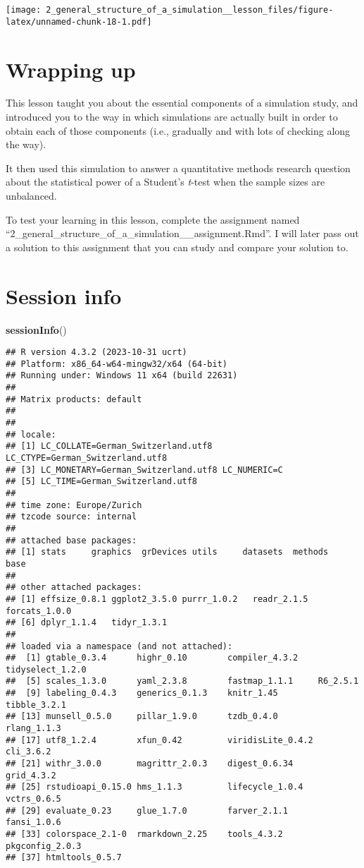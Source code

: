 \documentclass[
]{article}
\newenvironment{Shaded}{\begin{snugshade}}{\end{snugshade}}
\newcommand{\FunctionTok}[1]{\textcolor[rgb]{0.13,0.29,0.53}{\textbf{#1}}}
\newcommand{\NormalTok}[1]{#1}
\begin{document}
\texttt{[image: 2\_general\_structure\_of\_a\_simulation\_\_lesson\_files/figure-latex/unnamed-chunk-18-1.pdf]}

\hypertarget{wrapping-up}{%
\section{Wrapping up}\label{wrapping-up}}

This lesson taught you about the essential components of a simulation
study, and introduced you to the way in which simulations are actually
built in order to obtain each of those components (i.e., gradually and
with lots of checking along the way).

It then used this simulation to answer a quantitative methods research
question about the statistical power of a Student's \emph{t}-test when
the sample sizes are unbalanced.

To test your learning in this lesson, complete the assignment named
``2\_general\_structure\_of\_a\_simulation\_\_assignment.Rmd''. I will
later pass out a solution to this assignment that you can study and
compare your solution to.

\hypertarget{session-info}{%
\section{Session info}\label{session-info}}

\begin{Shaded}
\begin{Highlighting}[]
\FunctionTok{sessionInfo}\NormalTok{()}
\end{Highlighting}
\end{Shaded}

\begin{verbatim}
## R version 4.3.2 (2023-10-31 ucrt)
## Platform: x86_64-w64-mingw32/x64 (64-bit)
## Running under: Windows 11 x64 (build 22631)
## 
## Matrix products: default
## 
## 
## locale:
## [1] LC_COLLATE=German_Switzerland.utf8  LC_CTYPE=German_Switzerland.utf8   
## [3] LC_MONETARY=German_Switzerland.utf8 LC_NUMERIC=C                       
## [5] LC_TIME=German_Switzerland.utf8    
## 
## time zone: Europe/Zurich
## tzcode source: internal
## 
## attached base packages:
## [1] stats     graphics  grDevices utils     datasets  methods   base     
## 
## other attached packages:
## [1] effsize_0.8.1 ggplot2_3.5.0 purrr_1.0.2   readr_2.1.5   forcats_1.0.0
## [6] dplyr_1.1.4   tidyr_1.3.1  
## 
## loaded via a namespace (and not attached):
##  [1] gtable_0.3.4      highr_0.10        compiler_4.3.2    tidyselect_1.2.0 
##  [5] scales_1.3.0      yaml_2.3.8        fastmap_1.1.1     R6_2.5.1         
##  [9] labeling_0.4.3    generics_0.1.3    knitr_1.45        tibble_3.2.1     
## [13] munsell_0.5.0     pillar_1.9.0      tzdb_0.4.0        rlang_1.1.3      
## [17] utf8_1.2.4        xfun_0.42         viridisLite_0.4.2 cli_3.6.2        
## [21] withr_3.0.0       magrittr_2.0.3    digest_0.6.34     grid_4.3.2       
## [25] rstudioapi_0.15.0 hms_1.1.3         lifecycle_1.0.4   vctrs_0.6.5      
## [29] evaluate_0.23     glue_1.7.0        farver_2.1.1      fansi_1.0.6      
## [33] colorspace_2.1-0  rmarkdown_2.25    tools_4.3.2       pkgconfig_2.0.3  
## [37] htmltools_0.5.7
\end{verbatim}
\end{document}
